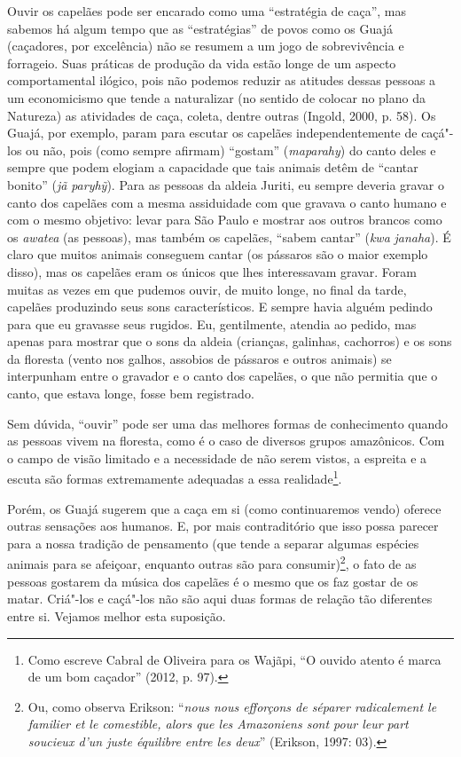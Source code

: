 Ouvir os capelães pode ser encarado como uma ``estratégia de caça'', mas
sabemos há algum tempo que as ``estratégias'' de povos como os Guajá
(caçadores, por excelência) não se resumem a um jogo de sobrevivência e
forrageio. Suas práticas de produção da vida estão longe de um aspecto
comportamental ilógico, pois não podemos reduzir as atitudes dessas
pessoas a um economicismo que tende a naturalizar (no sentido de colocar
no plano da Natureza) as atividades de caça, coleta, dentre outras
(Ingold, 2000, p. 58). Os Guajá, por exemplo, param para escutar os
capelães independentemente de caçá"-los ou não, pois (como sempre
afirmam) ``gostam'' (\emph{maparahy}) do canto deles e sempre que podem
elogiam a capacidade que tais animais detêm de ``cantar bonito''
(\emph{jã} \emph{paryhỹ}). Para as pessoas da aldeia Juriti, eu sempre
deveria gravar o canto dos capelães com a mesma assiduidade com que
gravava o canto humano e com o mesmo objetivo: levar para São Paulo e
mostrar aos outros brancos como os \emph{awatea} (as pessoas), mas
também os capelães, ``sabem cantar'' (\emph{kwa} \emph{janaha}). É claro
que muitos animais conseguem cantar (os pássaros são o maior exemplo
disso), mas os capelães eram os únicos que lhes interessavam gravar.
Foram muitas as vezes em que pudemos ouvir, de muito longe, no final da
tarde, capelães produzindo seus sons característicos. E sempre havia
alguém pedindo para que eu gravasse seus rugidos. Eu, gentilmente,
atendia ao pedido, mas apenas para mostrar que o sons da aldeia
(crianças, galinhas, cachorros) e os sons da floresta (vento nos galhos,
assobios de pássaros e outros animais) se interpunham entre o gravador e
o canto dos capelães, o que não permitia que o canto, que estava longe,
fosse bem registrado.

Sem dúvida, ``ouvir'' pode ser uma das melhores formas de conhecimento
quando as pessoas vivem na floresta, como é o caso de diversos grupos
amazônicos. Com o campo de visão limitado e a necessidade de não serem
vistos, a espreita e a escuta são formas extremamente adequadas a essa
realidade\footnote{Como escreve Cabral de Oliveira para os Wajãpi, ``O
  ouvido atento é marca de um bom caçador'' (2012, p. 97).}.

Porém, os Guajá sugerem que a caça em si (como continuaremos vendo)
oferece outras sensações aos humanos. E, por mais contraditório que isso
possa parecer para a nossa tradição de pensamento (que tende a separar
algumas espécies animais para se afeiçoar, enquanto outras são para
consumir)\footnote{Ou, como observa Erikson: ``\emph{nous nous efforçons
  de séparer radicalement le familier et le comestible, alors que les
  Amazoniens sont pour leur part soucieux d'un juste équilibre entre les
  deux}'' (Erikson, 1997: 03).}, o fato de as pessoas gostarem da música
dos capelães é o mesmo que os faz gostar de os matar. Criá"-los e
caçá"-los não são aqui duas formas de relação tão diferentes entre si.
Vejamos melhor esta suposição.

